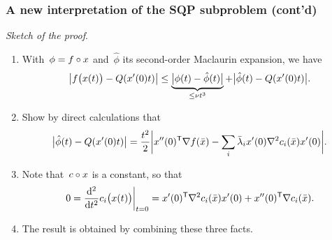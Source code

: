\documentclass{polyu-presentation}
\newcommand{\con}[1][]{c\ifthenelse{\equal{#1}{}}{}{_{#1}}}
\newcommand{\iter}[1][]{x\ifthenelse{\equal{#1}{}}{}{^{#1}}}
\newcommand{\lm}[1][]{\lambda\ifthenelse{\equal{#1}{}}{}{^{#1}}}
\newcommand{\obj}{f}
\begin{document}
\begin{frame}
    \frametitle{A new interpretation of the SQP subproblem (cont'd)}

    \emph{Sketch of the proof}.
    \begin{enumerate}
        \item With~$\phi = \obj \circ \iter$ and~$\hat{\phi}$ its second-order Maclaurin expansion, we have
        \begin{equation*}
            \abs[\big]{\obj \big(\iter(t) \big) - Q(\iter'(0) t)} \le \underbrace{\abs[\big]{\phi(t) - \hat{\phi}(t)}}_{\le \nu t^3} + \abs[\big]{\hat{\phi}(t) - Q(\iter'(0) t)}.
        \end{equation*}
        \item Show by direct calculations that
        \begin{equation*}
            \abs[\big]{\hat{\phi}(t) - Q(\iter'(0) t)} = \frac{t^2}{2} \abs[\bigg]{\iter''(0)^{\T} \nabla \obj(\bar{\iter}) - \sum_i \bar{\lm}_i \iter'(0) \nabla^2 \con[i](\bar{\iter}) \iter'(0)}.
        \end{equation*}
        \item Note that~$\con \circ x$ is a constant, so that
        \begin{equation*}
            0 = \frac{\du^2}{\du t^2} \con[i] \big( \iter(t) \big) \bigg\vert_{t = 0} = \iter'(0)^{\T} \nabla^2 \con[i](\bar{\iter}) \iter'(0) + \iter''(0)^{\T} \nabla \con[i](\bar{\iter}).
        \end{equation*}
        \item The result is obtained by combining these three facts.
    \end{enumerate}
\end{frame}
\end{document}
